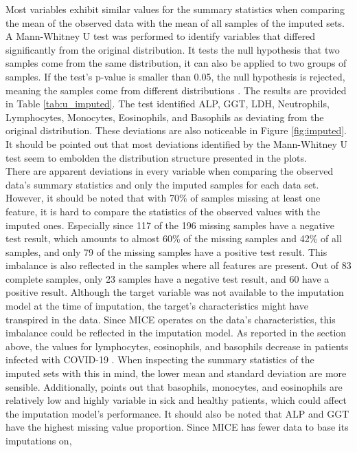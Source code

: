 Most variables exhibit similar values for the summary statistics when comparing 
the mean of the observed data with the mean of all samples of the imputed sets. 
A Mann-Whitney U test was performed to identify variables that differed 
significantly from the original distribution. It tests the null hypothesis that 
two samples come from the same distribution, it can also be applied to two 
groups of samples. If the test's p-value is smaller 
than 0.05, the null hypothesis is rejected, meaning the samples come from 
different distributions \cite{RN211}. The results are provided in Table 
\ref{tab:u_imputed}. The test identified ALP, GGT, LDH, Neutrophils, 
Lymphocytes, Monocytes, Eosinophils, and Basophils as deviating from the 
original distribution. These deviations are also noticeable in Figure 
\ref{fig:imputed}. It should be pointed out that most deviations identified by 
the Mann-Whitney U test seem to embolden the distribution structure presented in 
the plots. 
\\
There are apparent deviations in every variable when comparing the 
observed data's summary statistics and only the imputed samples for each data 
set. However, it should be noted that with 70\% of samples missing at least one 
feature, it is hard to compare the statistics of the observed values with the 
imputed ones. Especially since 117 of the 196 missing samples have a negative 
test result, which amounts to almost 60\% of the missing samples and 42\% of all 
samples, and only 79 of the missing samples have a positive test result. This 
imbalance is also reflected in the samples where all features are present. Out 
of 83 complete samples, only 23 samples have a negative test result, and 60 have 
a positive result. Although the target variable was not available to the 
imputation model at the time of imputation, the target's characteristics might 
have transpired in the data. Since MICE operates on the data's characteristics, 
this imbalance could be reflected in the imputation model. As reported in the 
section above, the values for lymphocytes, eosinophils, and basophils decrease 
in patients infected with COVID-19 \cite{RN162, RN181}. When inspecting the 
summary statistics of the imputed sets with this in mind, the lower mean and 
standard deviation are more sensible. Additionally, \cite{RN162} points out 
that basophils, monocytes, and eosinophils are relatively low and highly 
variable in sick and healthy patients, which could affect the imputation 
model's performance. It should also be noted that ALP and GGT have the highest 
missing value proportion. Since MICE has fewer data to base its imputations on, 
